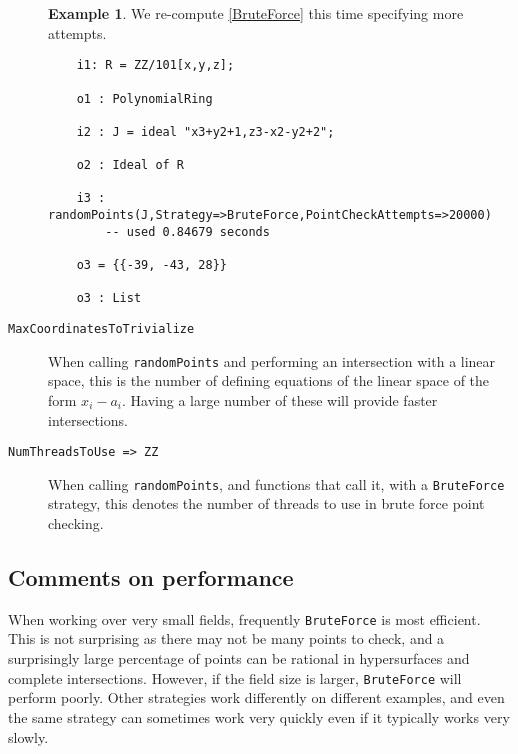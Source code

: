 \documentclass[11pt]{amsart}
\theoremstyle{definition}
\newtheorem{example}{Example}[section]
\begin{document}
\begin{description}
\begin{example}
	We re-compute \cref{BruteForce} this time specifying more attempts.
	
	

		{{\small\color{blue}
		\begin{verbatim}
	i1: R = ZZ/101[x,y,z];

	o1 : PolynomialRing

	i2 : J = ideal "x3+y2+1,z3-x2-y2+2";

	o2 : Ideal of R

	i3 : randomPoints(J,Strategy=>BruteForce,PointCheckAttempts=>20000)
		-- used 0.84679 seconds

	o3 = {{-39, -43, 28}}

	o3 : List
	\end{verbatim}
	}}
	\end{example}

	\vspace{1em}
	\item[\tt MaxCoordinatesToTrivialize]

	When calling {\tt randomPoints} and performing an intersection with a linear space, this is the number of defining equations of the linear space of the form $x_i - a_i$.  Having a large number of these will provide faster intersections.
	
	\vspace{1em}
	\item[\tt NumThreadsToUse => ZZ]

	When calling {\tt randomPoints}, and functions that call it, with a {\tt BruteForce} strategy, this denotes the number of threads to use in brute force point checking.
\end{description}

\subsection{Comments on performance}

	When working over very small fields, frequently {\tt BruteForce} is most efficient.  This is not surprising as there may not be many points to check, and a surprisingly large percentage of points can be rational in hypersurfaces and complete intersections.  However, if the field size is larger, {\tt BruteForce} will perform poorly.  Other strategies work differently on different examples, and even the same strategy can sometimes work very quickly even if it typically works very slowly.
	
\end{document}
